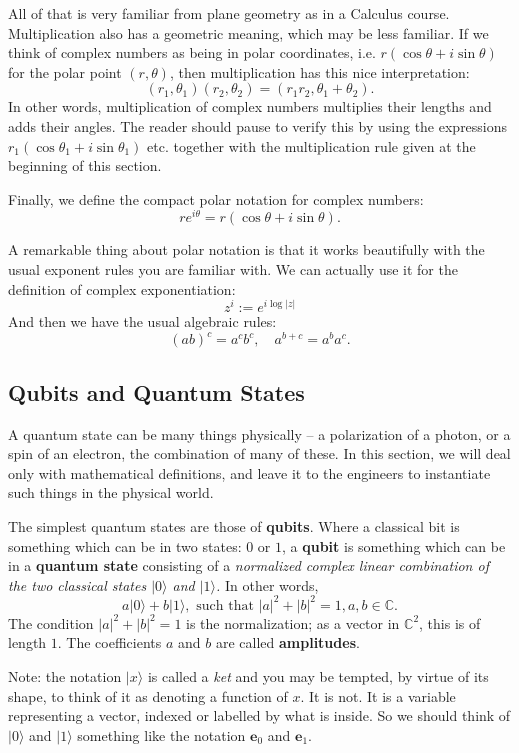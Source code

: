 \documentclass{article}
\theoremstyle{plain}
\theoremstyle{definition}
\theoremstyle{remark}
\numberwithin{theorem}{section}
\newcommand{\CC}{\mathbb{C}}
\begin{document}
All of that is very familiar from plane geometry as in a Calculus course.  Multiplication also has a geometric meaning, which may be less familiar.  If we think of complex numbers as being in polar coordinates, i.e. $r(\cos \theta + i \sin \theta)$ for the polar point $(r,\theta)$, then multiplication has this nice interpretation:
\[
(r_1, \theta_1)(r_2,\theta_2) = (r_1r_2, \theta_1 + \theta_2).
\]
In other words, multiplication of complex numbers multiplies their lengths and adds their angles.  The reader should pause to verify this by using the expressions $r_1(\cos\theta_1 + i \sin\theta_1)$ etc. together with the multiplication rule given at the beginning of this section.

Finally, we define the compact polar notation for complex numbers:
\[
r e^{i\theta} = r( \cos \theta + i \sin \theta).
\]

A remarkable thing about polar notation is that it works beautifully with the usual exponent rules you are familiar with.  We can actually use it for the definition of complex exponentiation:
\[
 z^i := e^{i \log|z|}
\]
And then we have the usual algebraic rules:
\[
(ab)^c = a^cb^c, \quad
a^{b+c} = a^b a^c.
\]

\subsection{Qubits and Quantum States}

A quantum state can be many things physically -- a polarization of a photon, or a spin of an electron, the combination of many of these.  In this section, we will deal only with mathematical definitions, and leave it to the engineers to instantiate such things in the physical world.

The simplest quantum states are those of \textbf{qubits}.  Where a classical bit is something which can be in two states: $0$ or $1$, a \textbf{qubit} is something which can be in a \textbf{quantum state} consisting of a \emph{normalized complex linear combination of the two classical states $|0\rangle$ and $|1\rangle$.}  In other words,
\[
a |0\rangle + b|1 \rangle, \text{ such that } |a|^2 + |b|^2 = 1, a,b \in \mathbb{C}.
\]
The condition $|a|^2+|b|^2=1$ is the normalization; as a vector in $\CC^2$, this is of length $1$.  The coefficients $a$ and $b$ are called \textbf{amplitudes}.

Note:  the notation $| x \rangle$ is called a \emph{ket} and you may be tempted, by virtue of its shape, to think of it as denoting a function of $x$.  It is not.  It is a variable representing a vector, indexed or labelled by what is inside.  So we should think of $|0\rangle$ and $|1\rangle$ something like the notation $\mathbf{e}_0$ and $\mathbf{e}_1$.
\end{document}
